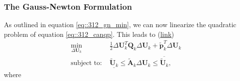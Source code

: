 \subsubsection{The Gauss-Newton Formulation}
As outlined in equation \ref{eq::312_gn_min}, we can now linearize the quadratic problem of equation \ref{eq::312_canqp}. This leads to (\href{https://github.com/mhubii/nmpc_pattern_generator/blob/dc1f5a9366cbbbf76f1b02cada642f6ac9a04c89/libs/pattern_generator/src/nmpc_generator.cpp#L377}{\underline{link}})
\begin{align}
	\min_{\Delta\bm{U}_k}&\frac{1}{2}\Delta\bm{U}_k^T\bm{Q}_k\Delta\bm{U}_k + \tilde{\bm{p}}_k^T\Delta\bm{U}_k \\
	\text{subject to: }&\underline{\tilde{\bm{U}}_k} \leq \tilde{\bm{A}}_k\Delta\bm{U}_k\leq\overline{\tilde{\bm{U}}_k},
\end{align}
where
